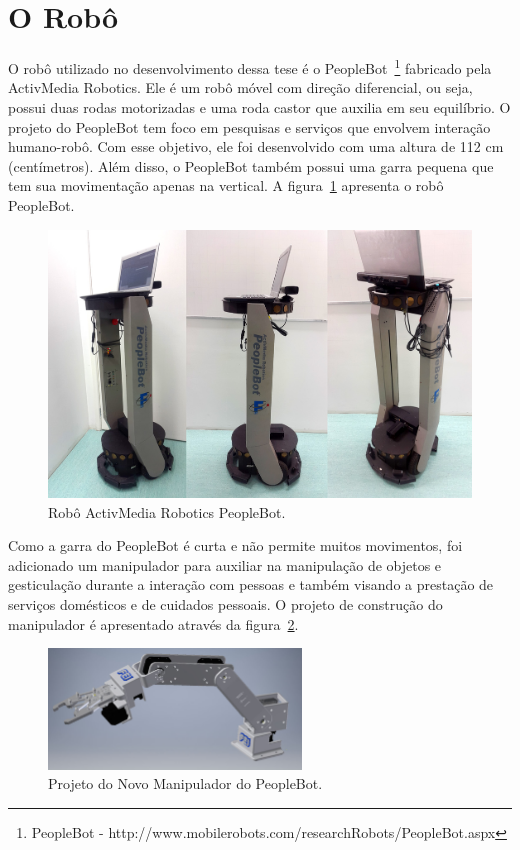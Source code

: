 \section{O Robô}
\label{sec:robo}
O robô utilizado no desenvolvimento dessa tese é o PeopleBot~\footnote{PeopleBot - http://www.mobilerobots.com/researchRobots/PeopleBot.aspx} fabricado pela ActivMedia Robotics. Ele é um robô móvel com direção diferencial, ou seja, possui duas rodas motorizadas e uma roda castor que auxilia em seu equilíbrio. O projeto do PeopleBot tem foco em pesquisas e serviços que envolvem interação humano-robô. Com esse objetivo, ele foi desenvolvido com uma altura de 112 cm (centímetros). Além disso, o PeopleBot também possui uma garra pequena que tem sua movimentação apenas na vertical. A figura~\ref{fig:peoplebot} apresenta o robô PeopleBot.

\begin{figure}[ht!]
	\centering
	\includegraphics[width=\textwidth]{images/peoplebot.jpg}
	\caption{Robô ActivMedia Robotics PeopleBot.}
	\label{fig:peoplebot}
\end{figure}

Como a garra do PeopleBot é curta e não permite muitos movimentos, foi adicionado um manipulador para auxiliar na manipulação de objetos e gesticulação durante a interação com pessoas e também visando a prestação de serviços domésticos e de cuidados pessoais. O projeto de construção do manipulador é apresentado através da figura~\ref{fig:manipulador}.

\begin{figure}[ht!]
	\centering
	\includegraphics[width=0.6\textwidth]{images/manipulador.jpg}
	\caption{Projeto do Novo Manipulador do PeopleBot.}
	\label{fig:manipulador}
\end{figure}

